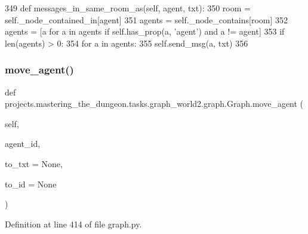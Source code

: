 \begin{DoxyCode}
349     \textcolor{keyword}{def }messages\_in\_same\_room\_as(self, agent, txt):
350         room = self.\_node\_contained\_in[agent]
351         agents = self.\_node\_contains[room]
352         agents = [a \textcolor{keywordflow}{for} a \textcolor{keywordflow}{in} agents \textcolor{keywordflow}{if} self.has\_prop(a, \textcolor{stringliteral}{'agent'}) \textcolor{keywordflow}{and} a != agent]
353         \textcolor{keywordflow}{if} len(agents) > 0:
354             \textcolor{keywordflow}{for} a \textcolor{keywordflow}{in} agents:
355                 self.send\_msg(a, txt)
356 
\end{DoxyCode}
\mbox{\label{classprojects_1_1mastering__the__dungeon_1_1tasks_1_1graph__world2_1_1graph_1_1Graph_a22747eb7801d7fabd0af3400410ae83d}} 
\subsubsection{\texorpdfstring{move\+\_\+agent()}{move\_agent()}}
{\footnotesize\ttfamily def projects.\+mastering\+\_\+the\+\_\+dungeon.\+tasks.\+graph\+\_\+world2.\+graph.\+Graph.\+move\+\_\+agent (\begin{DoxyParamCaption}\item[{}]{self,  }\item[{}]{agent\+\_\+id,  }\item[{}]{to\+\_\+txt = {\ttfamily None},  }\item[{}]{to\+\_\+id = {\ttfamily None} }\end{DoxyParamCaption})}



Definition at line 414 of file graph.\+py.


